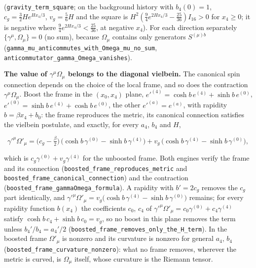 \documentclass[11pt]{article}
\begin{document}
(\texttt{gravity\_\allowbreak{}term\_squ\allowbreak{}are}; on the background history with $b_4(0) = 1$, $c_g = \tfrac32He^{Hx_4/3}$, $v_g = \tfrac56H$ and the square is $H^2(\tfrac94e^{2Hx_4/3} - \tfrac{25}{36})I_{16} > 0$ for $x_4 \geq 0$; it is negative where $\tfrac94e^{2Hx_4/3} < \tfrac{25}{36}$, at negative $x_4$). For each direction separately $\{\gamma^\mu, \Omega_\mu\} = 0$ (no sum), because $\Omega_\mu$ contains only generators $S^{(\mu)b}$ (\texttt{gamma\_mu\allowbreak{}\_anticom\allowbreak{}mutes\_wi\allowbreak{}th\_Omega\allowbreak{}\_mu\_no\_s\allowbreak{}um}, \texttt{anticomm\allowbreak{}utator\_g\allowbreak{}amma\_Ome\allowbreak{}ga\_vanis\allowbreak{}hes}).

\textbf{The value of $\gamma^\mu\Omega_\mu$ belongs to the diagonal vielbein.} The canonical spin connection depends on the choice of the local frame, and so does the contraction $\gamma^\mu\Omega_\mu$. Boost the frame in the $(x_0, x_4)$ plane, $e'^{(4)} = \cosh b\,e^{(4)} + \sinh b\,e^{(0)}$, $e'^{(0)} = \sinh b\,e^{(4)} + \cosh b\,e^{(0)}$, the other $e'^{(a)} = e^{(a)}$, with rapidity $b = \beta x_4 + b_0$: the frame reproduces the metric, its canonical connection satisfies the vielbein postulate, and exactly, for every $a_4$, $b_4$ and $H$,

\[
\gamma'^\mu\Omega'_\mu = \big(c_g - \tfrac{\beta}{2}\big)\,\big(\cosh b\,\gamma^{(0)} - \sinh b\,\gamma^{(4)}\big) + v_g\,\big(\cosh b\,\gamma^{(4)} - \sinh b\,\gamma^{(0)}\big),
\]

which is $c_g\gamma^{(0)} + v_g\gamma^{(4)}$ for the unboosted frame. Both engines verify the frame and its connection (\texttt{boosted\_\allowbreak{}frame\_re\allowbreak{}produces\allowbreak{}\_metric} and \texttt{boosted\_\allowbreak{}frame\_ca\allowbreak{}nonical\_\allowbreak{}connecti\allowbreak{}on}) and the contraction (\texttt{boosted\_\allowbreak{}frame\_ga\allowbreak{}mmaOmega\allowbreak{}\_formula}). A rapidity with $b' = 2c_g$ removes the $c_g$ part identically, and $\gamma'^\mu\Omega'_\mu = v_g\big(\cosh b\,\gamma^{(4)} - \sinh b\,\gamma^{(0)}\big)$ remains; for every rapidity function $b(x_4)$ the coefficients $c_0$, $c_4$ of $\gamma'^\mu\Omega'_\mu = c_0\gamma^{(0)} + c_4\gamma^{(4)}$ satisfy $\cosh b\,c_4 + \sinh b\,c_0 = v_g$, so no boost in this plane removes the term unless $b_4'/b_4 = a_4'/2$ (\texttt{boosted\_\allowbreak{}frame\_re\allowbreak{}moves\_on\allowbreak{}ly\_the\_H\allowbreak{}\_term}). In the boosted frame $\Omega'_\mu$ is nonzero and its curvature is nonzero for general $a_4$, $b_4$ (\texttt{boosted\_\allowbreak{}frame\_cu\allowbreak{}rvature\_\allowbreak{}nonzero}): what no frame removes, wherever the metric is curved, is $\Omega_\mu$ itself, whose curvature is the Riemann tensor.
\end{document}
